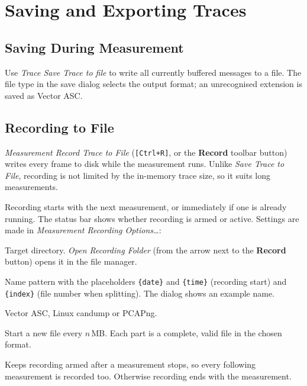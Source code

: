 \documentclass[a4paper,11pt]{article}
\newcommand{\key}[1]{\texttt{\small[#1]}}
\newcommand{\menu}[1]{\textit{#1}}
\newcommand{\ui}[1]{\textbf{#1}}
\begin{document}
\section{Saving and Exporting Traces}

\subsection{Saving During Measurement}

Use \menu{Trace \textrightarrow{} Save Trace to file} to write all currently buffered
messages to a file. The file type in the save dialog selects the output format;
an unrecognised extension is saved as Vector ASC.

\subsection{Recording to File}
\label{sec:record}

\menu{Measurement \textrightarrow{} Record Trace to File} (\key{Ctrl+R}, or the
\ui{Record} toolbar button) writes every frame to disk while the measurement runs.
Unlike \menu{Save Trace to File}, recording is not limited by the in-memory trace
size, so it suits long measurements.

Recording starts with the next measurement, or immediately if one is already
running. The status bar shows whether recording is armed or active. Settings are
made in \menu{Measurement \textrightarrow{} Recording Options\ldots}:

\begin{description}[leftmargin=2em, style=nextline]
  \item[Folder] Target directory. \menu{Open Recording Folder} (from the arrow next
        to the \ui{Record} button) opens it in the file manager.
  \item[File name] Name pattern with the placeholders \texttt{\{date\}} and
        \texttt{\{time\}} (recording start) and \texttt{\{index\}} (file number when
        splitting). The dialog shows an example name.
  \item[Format] Vector ASC, Linux candump or PCAPng.
  \item[Split Files] Start a new file every $n$\,MB. Each part is a complete,
        valid file in the chosen format.
  \item[Record every measurement] Keeps recording armed after a measurement stops,
        so every following measurement is recorded too. Otherwise recording ends
        with the measurement.
\end{description}
\end{document}

